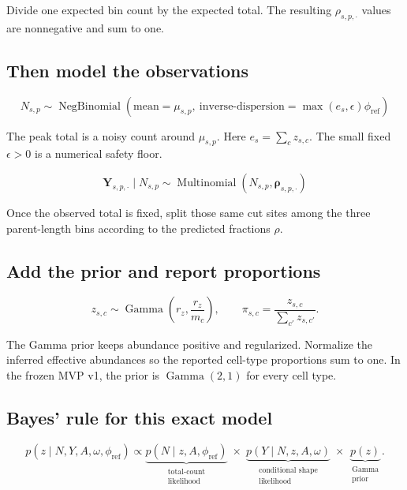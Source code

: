 \documentclass[11pt]{article}
\newcommand{\NB}{\operatorname{NegBinomial}}
\newcommand{\Mult}{\operatorname{Multinomial}}
\newcommand{\Gam}{\operatorname{Gamma}}
\begin{document}
\begin{translation}
Divide one expected bin count by the expected total. The resulting
\(\rho_{s,p,\boldsymbol{\cdot}}\) values are nonnegative and sum to one.
\end{translation}

\subsection{Then model the observations}

\[
\boxed{
N_{s,p}
\sim
\NB\left(
\text{mean}=\mu_{s,p},\
\text{inverse-dispersion}
=\max(e_s,\epsilon)\phi_{\mathrm{ref}}
\right)
}
\]

\begin{translation}
The peak total is a noisy count around \(\mu_{s,p}\). Here
\(e_s=\sum_cz_{s,c}\). The small fixed \(\epsilon>0\) is a numerical safety floor.
\end{translation}

\[
\boxed{
\boldsymbol{Y}_{s,p,\boldsymbol{\cdot}}\mid N_{s,p}
\sim
\Mult\left(
N_{s,p},\boldsymbol{\rho}_{s,p,\boldsymbol{\cdot}}
\right)
}
\]

\begin{translation}
Once the observed total is fixed, split those same cut sites among the three
parent-length bins according to the predicted fractions \(\rho\).
\end{translation}

\subsection{Add the prior and report proportions}

\[
z_{s,c}\sim\Gam\left(r_z,\frac{r_z}{m_c}\right),
\qquad
\pi_{s,c}=\frac{z_{s,c}}{\sum_{c'}z_{s,c'}}.
\]

\begin{translation}
The Gamma prior keeps abundance positive and regularized. Normalize the inferred
effective abundances so the reported cell-type proportions sum to one. In the
frozen MVP v1, the prior is \(\Gam(2,1)\) for every cell type.
\end{translation}

\subsection{Bayes' rule for this exact model}

\[
\boxed{
p(z\mid N,Y,A,\omega,\phi_{\mathrm{ref}})
\propto
\underbrace{p(N\mid z,A,\phi_{\mathrm{ref}})}_{\substack{\text{total-count}\\\text{likelihood}}}
\;\times\;
\underbrace{p(Y\mid N,z,A,\omega)}_{\substack{\text{conditional shape}\\\text{likelihood}}}
\;\times\;
\underbrace{p(z)}_{\substack{\text{Gamma}\\\text{prior}}}.
}
\]
\end{document}
